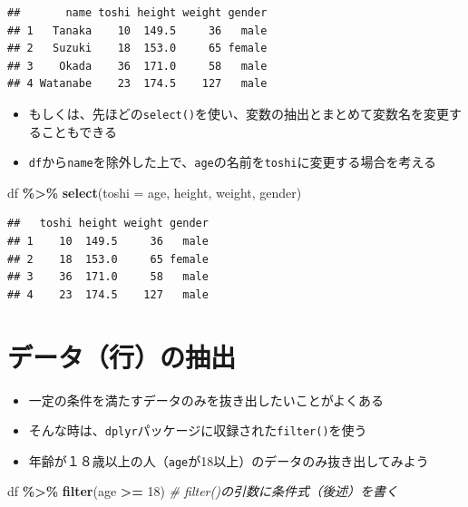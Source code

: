 \documentclass[
]{book}
\newenvironment{Shaded}{\begin{snugshade}}{\end{snugshade}}
\newcommand{\AttributeTok}[1]{\textcolor[rgb]{0.13,0.29,0.53}{#1}}
\newcommand{\CommentTok}[1]{\textcolor[rgb]{0.56,0.35,0.01}{\textit{#1}}}
\newcommand{\DecValTok}[1]{\textcolor[rgb]{0.00,0.00,0.81}{#1}}
\newcommand{\FunctionTok}[1]{\textcolor[rgb]{0.13,0.29,0.53}{\textbf{#1}}}
\newcommand{\NormalTok}[1]{#1}
\newcommand{\SpecialCharTok}[1]{\textcolor[rgb]{0.81,0.36,0.00}{\textbf{#1}}}
\providecommand{\tightlist}{%
  \setlength{\itemsep}{0pt}\setlength{\parskip}{0pt}}
\begin{document}
\begin{verbatim}
##       name toshi height weight gender
## 1   Tanaka    10  149.5     36   male
## 2   Suzuki    18  153.0     65 female
## 3    Okada    36  171.0     58   male
## 4 Watanabe    23  174.5    127   male
\end{verbatim}

\begin{itemize}
\tightlist
\item
  もしくは、先ほどの\texttt{select()}を使い、変数の抽出とまとめて変数名を変更することもできる
\item
  \texttt{df}から\texttt{name}を除外した上で、\texttt{age}の名前を\texttt{toshi}に変更する場合を考える
\end{itemize}

\begin{Shaded}
\begin{Highlighting}[]
\NormalTok{df }\SpecialCharTok{\%\textgreater{}\%} 
  \FunctionTok{select}\NormalTok{(}\AttributeTok{toshi =}\NormalTok{ age, height, weight, gender)}
\end{Highlighting}
\end{Shaded}

\begin{verbatim}
##   toshi height weight gender
## 1    10  149.5     36   male
## 2    18  153.0     65 female
## 3    36  171.0     58   male
## 4    23  174.5    127   male
\end{verbatim}

\hypertarget{ux30c7ux30fcux30bfux884cux306eux62bdux51fa}{%
\section{データ（行）の抽出}\label{ux30c7ux30fcux30bfux884cux306eux62bdux51fa}}

\begin{itemize}
\tightlist
\item
  一定の条件を満たすデータのみを抜き出したいことがよくある
\item
  そんな時は、\texttt{dplyr}パッケージに収録された\texttt{filter()}を使う
\item
  年齢が１８歳以上の人（\texttt{age}が18以上）のデータのみ抜き出してみよう
\end{itemize}

\begin{Shaded}
\begin{Highlighting}[]
\NormalTok{df }\SpecialCharTok{\%\textgreater{}\%} 
  \FunctionTok{filter}\NormalTok{(age }\SpecialCharTok{\textgreater{}=} \DecValTok{18}\NormalTok{) }\CommentTok{\# filter()の引数に条件式（後述）を書く}
\end{Highlighting}
\end{Shaded}
\end{document}
